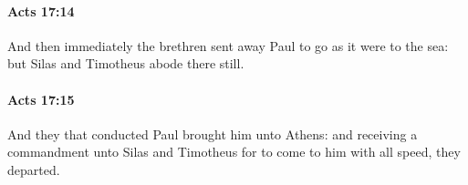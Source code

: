 		\paragraph{Acts 17:14} %
			\label{ACTS-17-14}

			And then immediately the brethren sent away Paul to go as it were to the sea: but Silas and Timotheus abode there still.

			\begin{framed}
			\scriptsize
				\begin{compactdesc}
					\item[SBLG] 
				\end{compactdesc}
			\end{framed}

		\paragraph{Acts 17:15} %
			\label{ACTS-17-15}

			And they that conducted Paul brought him unto Athens: and receiving a commandment unto Silas and Timotheus for to come to him with all speed, they departed.

